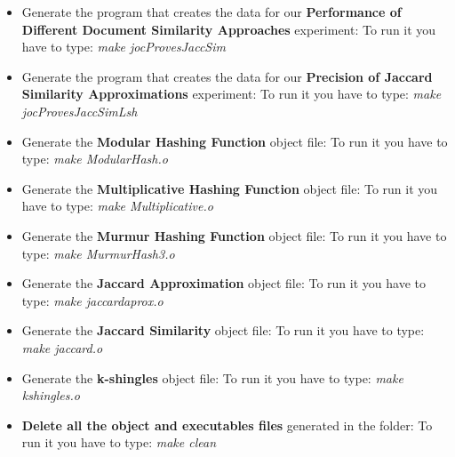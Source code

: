 \documentclass[12pt]{article}
\begin{document}
\begin{itemize}
\item Generate the program that creates the data for our \textbf{Performance of Different Document Similarity Approaches} experiment:
   To run it you have to type: \textit{make jocProvesJaccSim}
   \item Generate the program that creates the data for our \textbf{Precision of Jaccard Similarity Approximations} experiment:
   To run it you have to type: \textit{make jocProvesJaccSimLsh}
   \item Generate the \textbf{Modular Hashing Function} object file:
   To run it you have to type: \textit{make ModularHash.o} 
   \item Generate the \textbf{Multiplicative Hashing Function} object file:
   To run it you have to type: \textit{make Multiplicative.o}
   \item Generate the \textbf{Murmur Hashing Function} object file:
   To run it you have to type: \textit{make MurmurHash3.o}
   \item Generate the \textbf{Jaccard Approximation} object file:
   To run it you have to type: \textit{make jaccardaprox.o}
   \item Generate the \textbf{Jaccard Similarity} object file:
   To run it you have to type: \textit{make jaccard.o}
   \item Generate the \textbf{k-shingles} object file:
   To run it you have to type: \textit{make kshingles.o}
   \item \textbf{Delete all the object and executables files} generated in the folder:
   To run it you have to type: \textit{make clean}
   \end{itemize}
\end{document}
